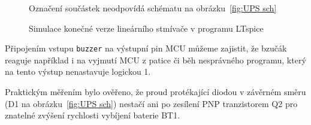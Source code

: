 \begin{figure}
    \centering
    \par\bigskip
    {\footnotesize Označení součástek neodpovídá schématu na
    obrázku~\vref{fig:UPS sch}}
    \caption{Simulace konečné verze lineárního stmívače v programu LTspice}
    \label{fig:UPS RC sim}
\end{figure}

Připojením vstupu \texttt{buzzer} na výstupní pin MCU můžeme zajistit, že
bzučák reaguje například i na vyjmutí MCU z patice či běh nesprávného programu,
který na tento výstup nenastavuje logickou 1.

Praktickým měřením bylo ověřeno, že proud protékající diodou v závěrném směru
(D1 na obrázku~\vref{fig:UPS sch}) nestačí ani po zesílení PNP tranzistorem Q2
pro znatelné zvýšení rychlosti vybíjení baterie BT1.
